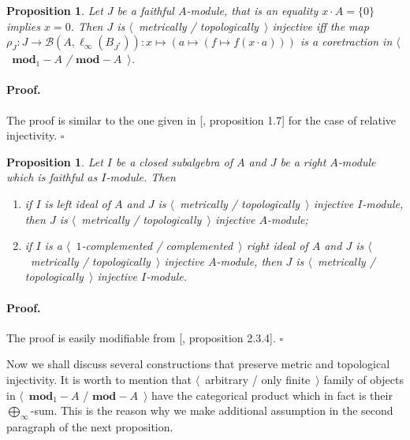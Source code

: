 \documentclass[12pt]{article}
\newtheorem{proposition}[theorem]{Proposition}
\renewenvironment{proof}{\paragraph{Proof.}}{\hfill$\square$\medskip}
\begin{document}
\begin{proposition}\label{NonDegenMetTopInjCharac}  Let $J$ be a faithful
    $A$-module, that is an equality $x\cdot A=\{0\}$ implies $x=0$. Then $J$ is
    $\langle$~metrically / topologically~$\rangle$ injective iff the map
    $\rho_J:J\to\mathcal{B}(A,\ell_\infty(B_{J^*})):x\mapsto(a\mapsto(f\mapsto
        f(x\cdot a)))$ is a coretraction in $\langle$~$\mathbf{mod}_1-A$ /
    $\mathbf{mod}-A$~$\rangle$.
\end{proposition}
\begin{proof} The proof is similar to the one given in
        [\cite{DalPolHomolPropGrAlg}, proposition 1.7] for the case of relative
    injectivity.
\end{proof}

\begin{proposition}\label{MetTopInjUnderChangeOfAlg} Let $I$ be a closed
    subalgebra of $A$ and $J$ be a right $A$-module which is faithful as
    $I$-module. Then
    \begin{enumerate}[label = (\roman*)]
        \item if $I$ is left ideal of $A$ and $J$ is $\langle$~metrically /
              topologically~$\rangle$  injective $I$-module, then $J$ is
              $\langle$~metrically / topologically~$\rangle$ injective
              $A$-module;

        \item if $I$ is a $\langle$~$1$-complemented  / complemented~$\rangle$
              right ideal of $A$ and $J$ is $\langle$~metrically /
              topologically~$\rangle$ injective $A$-module, then $J$ is
              $\langle$~metrically / topologically~$\rangle$ injective
              $I$-module.
    \end{enumerate}
\end{proposition}
\begin{proof} The proof is easily modifiable from
        [\cite{RamsHomPropSemgroupAlg}, proposition 2.3.4].
\end{proof}

Now we shall discuss several constructions that preserve metric and topological
injectivity. It is worth to mention that $\langle$~arbitrary / only
finite~$\rangle$ family of objects in $\langle$~$\mathbf{mod}_1-A$ / 
$\mathbf{mod}-A$~$\rangle$ have the categorical product which in 
fact is their $\bigoplus_\infty$-sum. This is the reason why we make 
additional assumption in the second paragraph of the next proposition.
\end{document}
